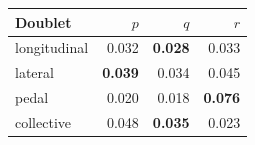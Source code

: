 \begin{tabular}{@{}lrrr@{}}
\toprule
Doublet & $p$ & $q$ & $r$ \\
\midrule
longitudinal & 0.032 & \textbf{0.028} & 0.033 \\
lateral & \textbf{0.039} & 0.034 & 0.045 \\
pedal & 0.020 & 0.018 & \textbf{0.076} \\
collective & 0.048 & \textbf{0.035} & 0.023 \\
\bottomrule
\end{tabular}
